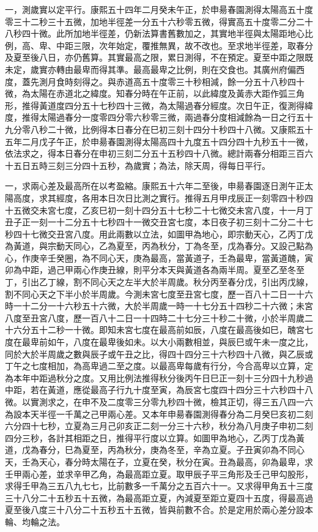 \begin{pinyinscope}
一，測歲實以定平行。康熙五十四年二月癸未午正，於申昜春園測得太陽高五十度零三十二秒三十五微，加地半徑差一分五十六秒零五微，得實高五十度零二分二十八秒四十微。此所加地半徑差，仍新法算書舊數加之，其實地半徑與太陽距地心比例，高、卑、中距三限，次年始定，覆推無異，故不改也。至求地半徑差，取春分及夏至後八日，亦仍舊算。其實最高之限，累日測得，不在預定。夏至中距之限既未定，歲實亦轉由最卑而得其準。最高最卑之比例，則在交食也。其廣州府偏西度，蓋先測月食時刻得之。與赤道高五十度零三十秒相減，餘一分五十八秒四十微，為太陽在赤道北之緯度。知春分時在午正前，以此緯度及黃赤大距作弧三角形，推得黃道度四分五十七秒四十三微，為太陽過春分經度。次日午正，復測得緯度，推得太陽過春分一度零四分零六秒零三微，兩過春分度相減餘為一日之行五十九分零八秒二十微，比例得本日春分在巳初三刻十四分十秒四十八微。又康熙五十五年二月戊子午正，於申昜春園測得太陽高四十九度五十四分四十九秒五十一微，依法求之，得本日春分在申初三刻二分五十五秒四十八微。總計兩春分相距三百六十五日五時三刻三分四十五秒，為歲實；為法，除天周，得每日平行。

一，求兩心差及最高所在以考盈縮。康熙五十六年二至後，申昜春園逐日測午正太陽高度，求其經度，各用本日次日比測之實行。推得五月甲戌辰正一刻零四十秒四十五微交未宮七度，乙亥巳初一刻十四分五十七秒二十七微交未宮八度，十一月丁丑子正一刻一十二分五十七秒四十一微交丑宮七度，本日夜子初三刻十二分二十七秒四十七微交丑宮八度。用此兩數以立法，如圖甲為地心，即宗動天心，乙丙丁戊為黃道，與宗動天同心，乙為夏至，丙為秋分，丁為冬至，戊為春分。又設己點為心，作庚辛壬癸圈，為不同心天，庚為最高，當黃道子，壬為最卑，當黃道醜，寅卯為中距，過己甲兩心作庚丑線，則平分本天與黃道各為兩半周。夏至乙至冬至丁，引出乙丁線，割不同心天之左半大於半周歲。秋分丙至春分戊，引出丙戊線，割不同心天之下半小於半周歲。今測未宮七度至丑宮七度，歷一百八十二日一十六時一十二分一十六秒五十六微，大於半周歲一時一十七分五十四秒二十六微；未宮八度至丑宮八度，歷一百八十二日一十四時二十七分三十秒二十微，小於半周歲二十六分五十二秒一十微。即知未宮七度在最高前如辰，八度在最高後如巳，醜宮七度在最卑前如午，八度在最卑後如未。以大小兩數相並，與辰巳或午未一度之比，同於大於半周歲之數與辰子或午丑之比，得四十四分三十六秒四十八微，與乙辰或丁午之七度相加，為高卑過二至之度。以最高卑每歲有行分，今合高卑以立算，定為本年中距過秋分之度。又用比例法推得秋分後丙午日巳正一刻十三分四十九秒過中距，若在黃道，應從最高子行九十度至寅，為辰宮七度四十四分三十六秒四十八微。以實測求之，在申不及二度零三分零九秒四十微，檢其正切，得三五八四一六為設本天半徑一千萬之己甲兩心差。又本年申昜春園測得春分為二月癸巳亥初二刻六分四十七秒，立夏為三月己卯亥正二刻一分三十六秒，秋分為八月庚子申初二刻四分三秒，各計其相距之日，推得平行度以立算。如圖甲為地心，乙丙丁戊為黃道，戊為春分，巳為夏至，丙為秋分，庚為冬至，辛為立夏。子丑寅卯為不同心天，壬為天心，春分時太陽在子，立夏在癸，秋分在寅。丑為最高，卯為最卑，求壬甲兩心差，並求辛甲乙角，為最高距立夏。取甲辰子平三角形及壬己甲勾股形，求得壬甲為三五八九七七，比前數多一千萬分之五百六十一。又求得甲角五十三度三十八分二十五秒五十五微，為最高距立夏，內減夏至距立夏四十五度，得最高過夏至後八度三十八分二十五秒五十五微，皆與前數不合。於是定用於兩心差分設本輪、均輪之法。


\end{pinyinscope}
